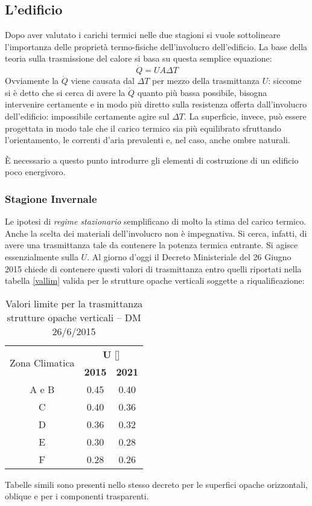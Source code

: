 \subsection{L'edificio}
Dopo aver valutato i carichi termici nelle due stagioni si vuole sottolineare l'importanza delle proprietà termo-fisiche dell'involucro dell'edificio.
La base della teoria sulla trasmissione del calore si basa su questa semplice equazione:
\begin{equation}
	\dot{Q}=UA\Delta T
\end{equation}
Ovviamente la $\dot{Q}$ viene causata dal $\Delta T$ per mezzo della trasmittanza $U$: siccome si è detto che si cerca di avere la $\dot{Q}$ quanto più bassa possibile, bisogna intervenire certamente e in modo più diretto sulla resistenza offerta dall'involucro dell'edificio: impossibile certamente agire sul $\Delta T$. La superficie, invece, può essere progettata in modo tale che il carico termico sia più equilibrato sfruttando l'orientamento, le correnti d'aria prevalenti e, nel caso, anche ombre naturali.

È necessario a questo punto introdurre gli elementi di costruzione di un edificio poco energivoro.

\subsubsection{Stagione Invernale}
Le ipotesi di \emph{regime stazionario} semplificano di molto la stima del carico termico. Anche la scelta dei materiali dell'involucro non è impegnativa. Si cerca, infatti, di avere una trasmittanza tale da contenere la potenza termica entrante. Si agisce essenzialmente sulla $U$. Al giorno d'oggi il Decreto Ministeriale del 26 Giugno 2015 chiede di contenere questi valori di trasmittanza entro quelli riportati nella tabella \vref{vallim} valida per le strutture opache verticali soggette a riqualificazione:
\begin{table}
	\centering
	\caption{Valori limite per la trasmittanza strutture opache verticali -- DM 26/6/2015}\label{vallim:opve}
	\begin{tabular}{ccc}
		\multirow{2}{*}{Zona Climatica} & \multicolumn{2}{c}{\textbf{U} [\trasm]}	\\
		\cmidrule(lr){2-3}
										& \textbf{2015} & \textbf{2021}				\\
		\midrule
		A e B							&	0.45		&	0.40 					\\
		C								& 	0.40		&	0.36					\\
		D								&	0.36		&	0.32					\\
		E								&	0.30		&	0.28					\\
		F								&	0.28		&	0.26					\\
	\end{tabular}
\end{table}
Tabelle simili sono presenti nello stesso decreto per le superfici opache orizzontali, oblique e per i componenti trasparenti.

